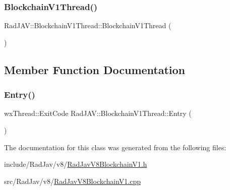 \subsubsection{\texorpdfstring{Blockchain\+V1\+Thread()}{BlockchainV1Thread()}}
{\footnotesize\ttfamily Rad\+J\+A\+V\+::\+Blockchain\+V1\+Thread\+::\+Blockchain\+V1\+Thread (\begin{DoxyParamCaption}{ }\end{DoxyParamCaption})}



\subsection{Member Function Documentation}
\mbox{\label{class_rad_j_a_v_1_1_blockchain_v1_thread_a379ed99f7db5d5fc77df43e87243f0d1}} 
\subsubsection{\texorpdfstring{Entry()}{Entry()}}
{\footnotesize\ttfamily wx\+Thread\+::\+Exit\+Code Rad\+J\+A\+V\+::\+Blockchain\+V1\+Thread\+::\+Entry (\begin{DoxyParamCaption}{ }\end{DoxyParamCaption})}



The documentation for this class was generated from the following files\+:\begin{DoxyCompactItemize}
\item 
include/\+Rad\+Jav/v8/\mbox{\hyperlink{_rad_jav_v8_blockchain_v1_8h}{Rad\+Jav\+V8\+Blockchain\+V1.\+h}}\item 
src/\+Rad\+Jav/v8/\mbox{\hyperlink{_rad_jav_v8_blockchain_v1_8cpp}{Rad\+Jav\+V8\+Blockchain\+V1.\+cpp}}\end{DoxyCompactItemize}
